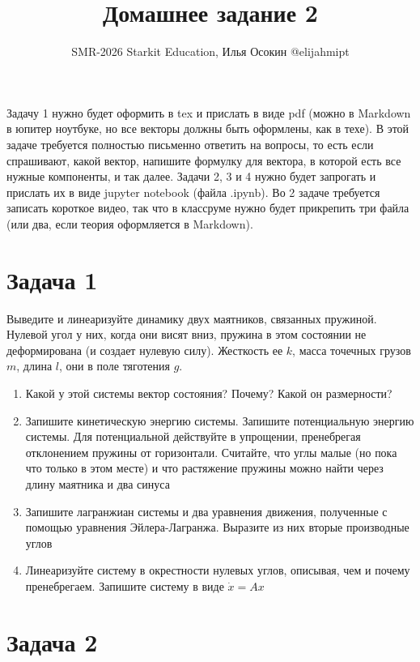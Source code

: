 \documentclass{article}
\begin{document}
\title{Домашнее задание 2}
\date{}
\author{SMR-2026 Starkit Education, Илья Осокин @elijahmipt} %
\maketitle

Задачу 1 нужно будет оформить в tex и прислать в виде pdf (можно в Markdown в юпитер ноутбуке, но все векторы должны быть оформлены, как в техе).
В этой задаче требуется полностью письменно ответить на вопросы, то есть если спрашивают, какой вектор, напишите формулку для вектора, в которой есть все нужные компоненты, и так далее.
Задачи 2, 3 и 4 нужно будет запрогать и прислать их в виде jupyter notebook (файла .ipynb).
Во 2 задаче требуется записать короткое видео, так что в классруме нужно будет прикрепить три файла (или два, если теория оформляется в Markdown).

\section*{Задача 1}

Выведите и линеаризуйте динамику двух маятников, связанных пружиной.
Нулевой угол у них, когда они висят вниз, пружина в этом состоянии не деформирована (и создает нулевую силу).
Жесткость ее $k$, масса точечных грузов $m$, длина $l$, они в поле тяготения $g$.

\begin{enumerate}
    \item Какой у этой системы вектор состояния? Почему? Какой он размерности?
    \item Запишите кинетическую энергию системы. Запишите потенциальную энергию системы. Для потенциальной действуйте в упрощении, пренебрегая отклонением пружины от горизонтали. Считайте, что углы малые (но пока что только в этом месте) и что растяжение пружины можно найти через длину маятника и два синуса
    \item Запишите лагранжиан системы и два уравнения движения, полученные с помощью уравнения Эйлера-Лагранжа. Выразите из них вторые производные углов
    \item Линеаризуйте систему в окрестности нулевых углов, описывая, чем и почему пренебрегаем. Запишите систему в виде $\dot{x} = A x$
\end{enumerate}

\section*{Задача 2}
\end{document}
